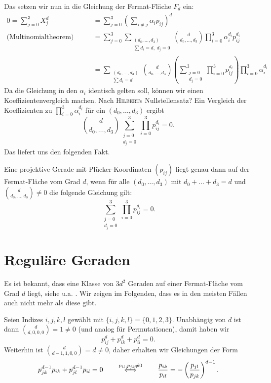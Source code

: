 Das setzen wir nun in die Gleichung der Fermat-Fläche $F_d$ ein:
\begin{align*}
0 = \sum_{j=0}^3 X_j^d &= \sum_{j=0}^3 \left(\sum_{i \neq j} \alpha_i p_{ij} \right)^d \\
\text{(Multinomialtheorem)}\qquad &= \sum_{j=0}^3 \sum_{\substack{(d_0,\dots,d_3) \\ \sum d_i=d,\;d_j=0}} \binom d{d_0,\dots,d_3} \prod_{i=0}^3 \alpha_i^{d_i} p_{ij}^{d_i} \\
	&= \sum_{\substack{(d_0,\dots,d_3) \\ \sum d_i=d}} \binom d{d_0,\dots,d_3} \left(\sum_{\substack{j=0 \\ d_j=0}}^3 \prod_{i=0}^3 p_{ij}^{d_i} \right) \prod_{i=0}^3 \alpha_i^{d_i}
\end{align*}
Da die Gleichung in den $\alpha_i$ identisch gelten soll, können wir einen Koeffizientenvergleich machen. \note Nach \textsc{Hilbert}s Nullstellensatz? Ein Vergleich der Koeffizienten zu $\prod_{i=0}^3 \alpha_i^{d_i}$ für ein $(d_0,\dots,d_3)$ ergibt
\begin{equation}
\binom d{d_0,\dots,d_3} \sum_{\substack{j=0 \\ d_j=0}}^3 \prod_{i=0}^3 p_{ij}^{d_i} = 0.
\end{equation}
Das liefert uns den folgenden Fakt.

\begin{fact}
Eine projektive Gerade mit Plücker-Koordinaten $(p_{ij})$ liegt genau dann auf der Fermat-Fläche vom Grad $d$, wenn für alle $(d_0,\dots,d_3)$ mit $d_0 + \dots + d_3 = d$ und $\binom d{d_0,\dots,d_3} \neq 0$ die folgende Gleichung gilt:
\begin{equation}
\sum_{\substack{j=0 \\ d_j=0}}^3 \prod_{i=0}^3 p_{ij}^{d_i} = 0.
\end{equation}
\end{fact}

\section{Reguläre Geraden}
Es ist bekannt, dass eine Klasse von $3d^2$ Geraden auf einer Fermat-Fläche vom Grad $d$ liegt, siehe u.a. \cite[S.~5]{LinesOnFermat}. Wir zeigen im Folgenden, dass es in den meisten Fällen auch nicht mehr als diese gibt.

Seien Indizes $i,j,k,l$ gewählt mit $\{i,j,k,l\} = \{0,1,2,3\}$. Unabhängig von $d$ ist dann $\binom d{d,0,0,0} = 1 \neq 0$ (und analog für Permutationen), damit haben wir
\begin{equation} \label{eq:powers}
p_{ij}^d + p_{ik}^d + p_{il}^d = 0.
\end{equation}
Weiterhin ist $\binom d{d-1,1,0,0} = d \neq 0$, daher erhalten wir Gleichungen der Form
\begin{equation} \label{eq:ratios}
p_{jk}^{d-1} p_{ik} + p_{jl}^{d-1} p_{il} = 0 \qquad\overrel\Longleftrightarrow^{p_{il}, p_{jk} \neq 0}\qquad \frac{p_{ik}}{p_{il}} = -\left(\frac{p_{jl}}{p_{jk}}\right)^{d-1}.
\end{equation}

